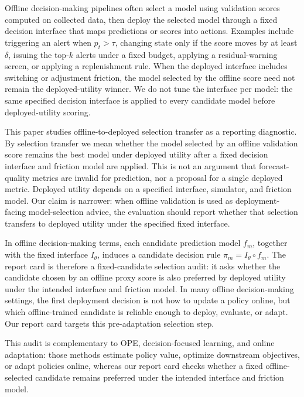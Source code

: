 \documentclass{article}
\begin{document}
Offline decision-making pipelines often select a model using validation scores computed on collected data, then deploy the selected model through a fixed decision interface that maps predictions or scores into actions. Examples include triggering an alert when \(p_t > \tau\), changing state only if the score moves by at least \(\delta\), issuing the top-\(k\) alerts under a fixed budget, applying a residual-warning screen, or applying a replenishment rule. When the deployed interface includes switching or adjustment friction, the model selected by the offline score need not remain the deployed-utility winner. We do not tune the interface per model: the same specified decision interface is applied to every candidate model before deployed-utility scoring.

This paper studies offline-to-deployed selection transfer as a reporting diagnostic. By selection transfer we mean whether the model selected by an offline validation score remains the best model under deployed utility after a fixed decision interface and friction model are applied. This is not an argument that forecast-quality metrics are invalid for prediction, nor a proposal for a single deployed metric. Deployed utility depends on a specified interface, simulator, and friction model. Our claim is narrower: when offline validation is used as deployment-facing model-selection advice, the evaluation should report whether that selection transfers to deployed utility under the specified fixed interface.

In offline decision-making terms, each candidate prediction model \(f_m\), together with the fixed interface \(I_\theta\), induces a candidate decision rule \(\pi_m=I_\theta\circ f_m\). The report card is therefore a fixed-candidate selection audit: it asks whether the candidate chosen by an offline proxy score is also preferred by deployed utility under the intended interface and friction model. In many offline decision-making settings, the first deployment decision is not how to update a policy online, but which offline-trained candidate is reliable enough to deploy, evaluate, or adapt. Our report card targets this pre-adaptation selection step.

This audit is complementary to OPE, decision-focused learning, and online adaptation: those methods estimate policy value, optimize downstream objectives, or adapt policies online, whereas our report card checks whether a fixed offline-selected candidate remains preferred under the intended interface and friction model.
\end{document}
